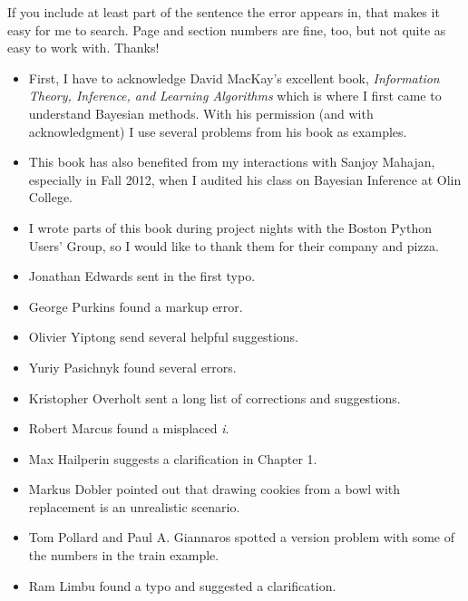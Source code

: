 \documentclass[12pt]{book}
\begin{document}
If you include at least part of the sentence the
error appears in, that makes it easy for me to search.  Page and
section numbers are fine, too, but not quite as easy to work with.
Thanks!

\small

\begin{itemize}

\item First, I have to acknowledge David MacKay's excellent book,
  {\it Information Theory, Inference, and Learning Algorithms} which is
  where I first came to understand Bayesian methods.  With his
  permission (and with acknowledgment) I use several problems from
  his book as examples.

\item This book has also benefited from my interactions with Sanjoy
  Mahajan, especially in Fall 2012, when I audited his class on
  Bayesian Inference at Olin College.

\item I wrote parts of this book during project nights with the Boston
  Python Users' Group, so I would like to thank them for their
  company and pizza.

\item Jonathan Edwards sent in the first typo.

\item George Purkins found a markup error.

\item Olivier Yiptong send several helpful suggestions.

\item Yuriy Pasichnyk found several errors.

\item Kristopher Overholt sent a long list of corrections and suggestions.

\item Robert Marcus found a misplaced {\it i}.

\item Max Hailperin suggests a clarification in Chapter 1.

\item Markus Dobler pointed out that drawing cookies from a bowl
with replacement is an unrealistic scenario.

\item Tom Pollard and Paul A. Giannaros spotted a version problem with
  some of the numbers in the train example.

\item Ram Limbu found a typo and suggested a clarification.


\end{itemize}
\end{document}
